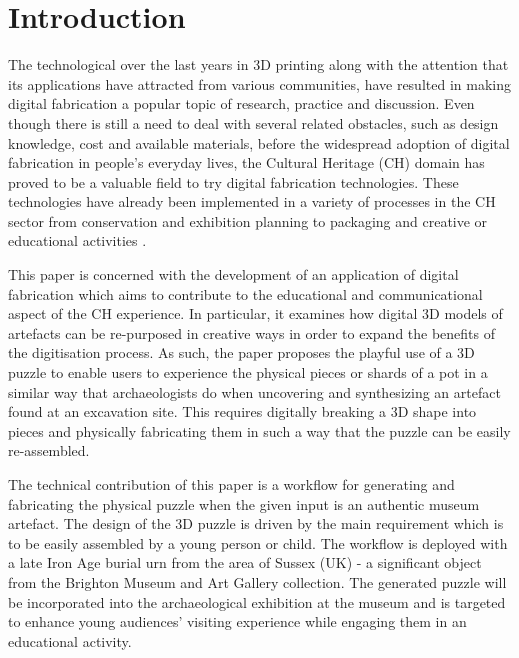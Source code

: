 \documentclass[acmlarge,screen,dvipsnames]{acmart}
\begin{document}
\begin{abstract}

\printccsdesc   
\end{abstract}

\section{Introduction}

The technological over the last years in 3D printing along with the
attention that its applications have attracted from various
communities, have resulted in making digital fabrication a popular
topic of research, practice and discussion. Even though there is still
a need to deal with several related obstacles, such as design
knowledge, cost and available materials, before the widespread
adoption of digital fabrication in people's everyday lives, the
Cultural Heritage (CH) domain has proved to be a valuable field to try
digital fabrication technologies. These technologies have already been
implemented in a variety of processes in the CH sector from
conservation and exhibition planning to packaging and creative or
educational activities
\cite{Neely2013,Scopigno2014,Neumuller2014,Scopigno2015}.

This paper is concerned with the development of an application of
digital fabrication which aims to contribute to the educational and
communicational aspect of the CH experience. In particular, it
examines how digital 3D models of artefacts can be re-purposed in
creative ways in order to expand the benefits of the digitisation
process. As such, the paper proposes the playful use of a 3D puzzle to
enable users to experience the physical pieces or shards of a pot in a
similar way that archaeologists do when uncovering and synthesizing an
artefact found at an excavation site. This requires digitally breaking
a 3D shape into pieces and physically fabricating them in such a way
that the puzzle can be easily re-assembled.

The technical contribution of this paper is a workflow for generating
and fabricating the physical puzzle when the given input is an
authentic museum artefact. The design of the 3D puzzle is driven by
the main requirement which is to be easily assembled by a young person
or child. The workflow is deployed with a late Iron Age burial urn
from the area of Sussex (UK) - a significant object from the Brighton
Museum and Art Gallery collection. The generated puzzle will be
incorporated into the archaeological exhibition at the museum and is
targeted to enhance young audiences' visiting experience while
engaging them in an educational activity.
\end{document}
